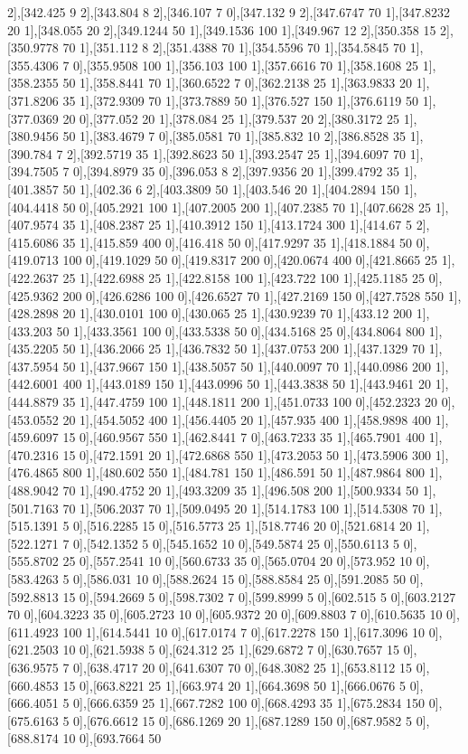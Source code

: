 {2],[342.425 9 2],[343.804 8 2],[346.107 7 0],[347.132 9 2],[347.6747 70 1],[347.8232 20 1],[348.055 20 2],[349.1244 50 1],[349.1536 100 1],[349.967 12 2],[350.358 15 2],[350.9778 70 1],[351.112 8 2],[351.4388 70 1],[354.5596 70 1],[354.5845 70 1],[355.4306 7 0],[355.9508 100 1],[356.103 100 1],[357.6616 70 1],[358.1608 25 1],[358.2355 50 1],[358.8441 70 1],[360.6522 7 0],[362.2138 25 1],[363.9833 20 1],[371.8206 35 1],[372.9309 70 1],[373.7889 50 1],[376.527 150 1],[376.6119 50 1],[377.0369 20 0],[377.052 20 1],[378.084 25 1],[379.537 20 2],[380.3172 25 1],[380.9456 50 1],[383.4679 7 0],[385.0581 70 1],[385.832 10 2],[386.8528 35 1],[390.784 7 2],[392.5719 35 1],[392.8623 50 1],[393.2547 25 1],[394.6097 70 1],[394.7505 7 0],[394.8979 35 0],[396.053 8 2],[397.9356 20 1],[399.4792 35 1],[401.3857 50 1],[402.36 6 2],[403.3809 50 1],[403.546 20 1],[404.2894 150 1],[404.4418 50 0],[405.2921 100 1],[407.2005 200 1],[407.2385 70 1],[407.6628 25 1],[407.9574 35 1],[408.2387 25 1],[410.3912 150 1],[413.1724 300 1],[414.67 5 2],[415.6086 35 1],[415.859 400 0],[416.418 50 0],[417.9297 35 1],[418.1884 50 0],[419.0713 100 0],[419.1029 50 0],[419.8317 200 0],[420.0674 400 0],[421.8665 25 1],[422.2637 25 1],[422.6988 25 1],[422.8158 100 1],[423.722 100 1],[425.1185 25 0],[425.9362 200 0],[426.6286 100 0],[426.6527 70 1],[427.2169 150 0],[427.7528 550 1],[428.2898 20 1],[430.0101 100 0],[430.065 25 1],[430.9239 70 1],[433.12 200 1],[433.203 50 1],[433.3561 100 0],[433.5338 50 0],[434.5168 25 0],[434.8064 800 1],[435.2205 50 1],[436.2066 25 1],[436.7832 50 1],[437.0753 200 1],[437.1329 70 1],[437.5954 50 1],[437.9667 150 1],[438.5057 50 1],[440.0097 70 1],[440.0986 200 1],[442.6001 400 1],[443.0189 150 1],[443.0996 50 1],[443.3838 50 1],[443.9461 20 1],[444.8879 35 1],[447.4759 100 1],[448.1811 200 1],[451.0733 100 0],[452.2323 20 0],[453.0552 20 1],[454.5052 400 1],[456.4405 20 1],[457.935 400 1],[458.9898 400 1],[459.6097 15 0],[460.9567 550 1],[462.8441 7 0],[463.7233 35 1],[465.7901 400 1],[470.2316 15 0],[472.1591 20 1],[472.6868 550 1],[473.2053 50 1],[473.5906 300 1],[476.4865 800 1],[480.602 550 1],[484.781 150 1],[486.591 50 1],[487.9864 800 1],[488.9042 70 1],[490.4752 20 1],[493.3209 35 1],[496.508 200 1],[500.9334 50 1],[501.7163 70 1],[506.2037 70 1],[509.0495 20 1],[514.1783 100 1],[514.5308 70 1],[515.1391 5 0],[516.2285 15 0],[516.5773 25 1],[518.7746 20 0],[521.6814 20 1],[522.1271 7 0],[542.1352 5 0],[545.1652 10 0],[549.5874 25 0],[550.6113 5 0],[555.8702 25 0],[557.2541 10 0],[560.6733 35 0],[565.0704 20 0],[573.952 10 0],[583.4263 5 0],[586.031 10 0],[588.2624 15 0],[588.8584 25 0],[591.2085 50 0],[592.8813 15 0],[594.2669 5 0],[598.7302 7 0],[599.8999 5 0],[602.515 5 0],[603.2127 70 0],[604.3223 35 0],[605.2723 10 0],[605.9372 20 0],[609.8803 7 0],[610.5635 10 0],[611.4923 100 1],[614.5441 10 0],[617.0174 7 0],[617.2278 150 1],[617.3096 10 0],[621.2503 10 0],[621.5938 5 0],[624.312 25 1],[629.6872 7 0],[630.7657 15 0],[636.9575 7 0],[638.4717 20 0],[641.6307 70 0],[648.3082 25 1],[653.8112 15 0],[660.4853 15 0],[663.8221 25 1],[663.974 20 1],[664.3698 50 1],[666.0676 5 0],[666.4051 5 0],[666.6359 25 1],[667.7282 100 0],[668.4293 35 1],[675.2834 150 0],[675.6163 5 0],[676.6612 15 0],[686.1269 20 1],[687.1289 150 0],[687.9582 5 0],[688.8174 10 0],[693.7664 50 }

